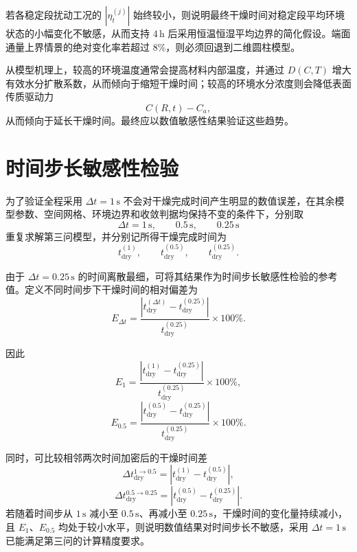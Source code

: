 \documentclass[UTF8,a4paper,12pt]{ctexart}
\begin{document}
若各稳定段扰动工况的 $|\eta_t^{(j)}|$ 始终较小，则说明最终干燥时间对稳定段平均环境状态的小幅变化不敏感，从而支持 $4\,\mathrm{h}$ 后采用恒温恒湿平均边界的简化假设。端面通量上界情景的绝对变化率若超过 $8\%$，则必须回退到二维圆柱模型。

从模型机理上，较高的环境温度通常会提高材料内部温度，并通过 $D(C,T)$ 增大有效水分扩散系数，从而倾向于缩短干燥时间；较高的环境水分浓度则会降低表面传质驱动力
\[
C(R,t)-C_a,
\]
从而倾向于延长干燥时间。最终应以数值敏感性结果验证这些趋势。


\section{时间步长敏感性检验}

为了验证全程采用 $\Delta t=1\,\mathrm{s}$ 不会对干燥完成时间产生明显的数值误差，在其余模型参数、空间网格、环境边界和收敛判据均保持不变的条件下，分别取
\begin{equation}
    \Delta t=1\,\mathrm{s},\qquad
    0.5\,\mathrm{s},\qquad
    0.25\,\mathrm{s}
    \label{eq:dt_sensitivity_set}
\end{equation}
重复求解第三问模型，并分别记所得干燥完成时间为
\begin{equation}
    t_{\mathrm{dry}}^{(1)},\qquad
    t_{\mathrm{dry}}^{(0.5)},\qquad
    t_{\mathrm{dry}}^{(0.25)}.
\end{equation}

由于 $\Delta t=0.25\,\mathrm{s}$ 的时间离散最细，可将其结果作为时间步长敏感性检验的参考值。定义不同时间步下干燥时间的相对偏差为
\begin{equation}
    E_{\Delta t}
    =
    \frac{
        \left|
        t_{\mathrm{dry}}^{(\Delta t)}
        -t_{\mathrm{dry}}^{(0.25)}
        \right|
    }{
        t_{\mathrm{dry}}^{(0.25)}
    }
    \times100\%.
    \label{eq:time_step_error}
\end{equation}

因此
\begin{equation}
    E_{1}
    =
    \frac{
        \left|t_{\mathrm{dry}}^{(1)}-t_{\mathrm{dry}}^{(0.25)}\right|
    }{
        t_{\mathrm{dry}}^{(0.25)}
    }
    \times100\%,
\end{equation}
\begin{equation}
    E_{0.5}
    =
    \frac{
        \left|t_{\mathrm{dry}}^{(0.5)}-t_{\mathrm{dry}}^{(0.25)}\right|
    }{
        t_{\mathrm{dry}}^{(0.25)}
    }
    \times100\%.
\end{equation}

同时，可比较相邻两次时间加密后的干燥时间差
\begin{equation}
    \Delta t_{\mathrm{dry}}^{1\rightarrow0.5}
    =
    \left|t_{\mathrm{dry}}^{(1)}-t_{\mathrm{dry}}^{(0.5)}\right|,
\end{equation}
\begin{equation}
    \Delta t_{\mathrm{dry}}^{0.5\rightarrow0.25}
    =
    \left|t_{\mathrm{dry}}^{(0.5)}-t_{\mathrm{dry}}^{(0.25)}\right|.
\end{equation}
若随着时间步从 $1\,\mathrm{s}$ 减小至 $0.5\,\mathrm{s}$、再减小至 $0.25\,\mathrm{s}$，干燥时间的变化量持续减小，且 $E_1$、$E_{0.5}$ 均处于较小水平，则说明数值结果对时间步长不敏感，采用 $\Delta t=1\,\mathrm{s}$ 已能满足第三问的计算精度要求。
\end{document}
